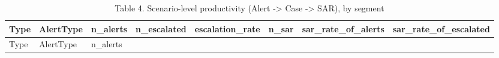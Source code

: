 \documentclass[
]{article}
\begin{document}
\begin{longtable}[]{@{}
  >{\raggedright\arraybackslash}p{}
  >{\raggedright\arraybackslash}p{}
  >{\raggedleft\arraybackslash}p{}
  >{\raggedleft\arraybackslash}p{}
  >{\raggedleft\arraybackslash}p{}
  >{\raggedleft\arraybackslash}p{}
  >{\raggedleft\arraybackslash}p{}
  >{\raggedleft\arraybackslash}p{}@{}}
\caption{Table 4. Scenario-level productivity (Alert -\textgreater{}
Case -\textgreater{} SAR), by segment}\tabularnewline
\toprule\noalign{}
\begin{minipage}[b]{\linewidth}\raggedright
Type
\end{minipage} & \begin{minipage}[b]{\linewidth}\raggedright
AlertType
\end{minipage} & \begin{minipage}[b]{\linewidth}\raggedleft
n\_alerts
\end{minipage} & \begin{minipage}[b]{\linewidth}\raggedleft
n\_escalated
\end{minipage} & \begin{minipage}[b]{\linewidth}\raggedleft
escalation\_rate
\end{minipage} & \begin{minipage}[b]{\linewidth}\raggedleft
n\_sar
\end{minipage} & \begin{minipage}[b]{\linewidth}\raggedleft
sar\_rate\_of\_alerts
\end{minipage} & \begin{minipage}[b]{\linewidth}\raggedleft
sar\_rate\_of\_escalated
\end{minipage} \\
\midrule\noalign{}
\endfirsthead
\toprule\noalign{}
\begin{minipage}[b]{\linewidth}\raggedright
Type
\end{minipage} & \begin{minipage}[b]{\linewidth}\raggedright
AlertType
\end{minipage} & \begin{minipage}[b]{\linewidth}\raggedleft
n\_alerts
\end{minipage} & \begin{minipage}[b]{\linewidth}\raggedleft

\end{minipage}
\end{longtable}
\end{document}
